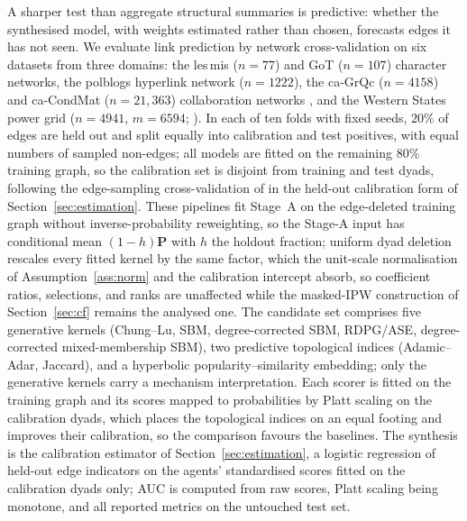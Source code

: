 \documentclass[12pt]{article}
\newcommand{\1}{\mathbf{1}}
\newcommand{\Pmat}{\mathbf{P}}
\begin{document}
A sharper test than aggregate structural summaries is predictive: whether the synthesised model, with weights
estimated rather than chosen, forecasts edges it has not seen. We evaluate link prediction by network
cross-validation on six datasets from three domains: the \textsf{les\,mis} ($n=77$) and \textsf{GoT}
($n=107$) character networks, the \textsf{polblogs} hyperlink network ($n=1222$), the \textsf{ca-GrQc}
($n=4158$) and \textsf{ca-CondMat} ($n=21{,}363$) collaboration networks
\citep{leskovec2007graph}, and the Western States \textsf{power} grid ($n=4941$, $m=6594$;
\citealp{watts1998collective}). In each of ten folds with fixed seeds, $20\%$ of edges are held out and split
equally into calibration and test positives, with equal numbers of sampled non-edges; all models are fitted on
the remaining $80\%$ training graph, so the calibration set is disjoint from training and test dyads,
following the edge-sampling cross-validation of \citet{li2020network} in the held-out calibration form of
Section~\ref{sec:estimation}. These pipelines fit Stage~A on the edge-deleted training graph without
inverse-probability reweighting, so the Stage-A input has conditional mean $(1-h)\Pmat$ with $h$ the holdout
fraction; uniform dyad deletion rescales every fitted kernel by the same factor, which the unit-scale
normalisation of Assumption~\ref{ass:norm} and the calibration intercept absorb, so coefficient ratios,
selections, and ranks are unaffected while the masked-IPW construction of Section~\ref{sec:cf} remains the
analysed one. The candidate set comprises five generative kernels (Chung--Lu, SBM, degree-corrected SBM,
RDPG/ASE, degree-corrected mixed-membership SBM), two predictive topological indices (Adamic--Adar, Jaccard),
and a hyperbolic popularity--similarity embedding; only the generative kernels carry a mechanism
interpretation. Each scorer is fitted on the training graph and its scores mapped to probabilities by Platt
scaling on the calibration dyads, which places the topological indices on an equal footing and improves their
calibration, so the comparison favours the baselines. The synthesis is the calibration estimator of
Section~\ref{sec:estimation}, a logistic regression of held-out edge indicators on the agents' standardised
scores fitted on the calibration dyads only; AUC is computed from raw scores, Platt scaling being monotone,
and all reported metrics on the untouched test set.
\end{document}
